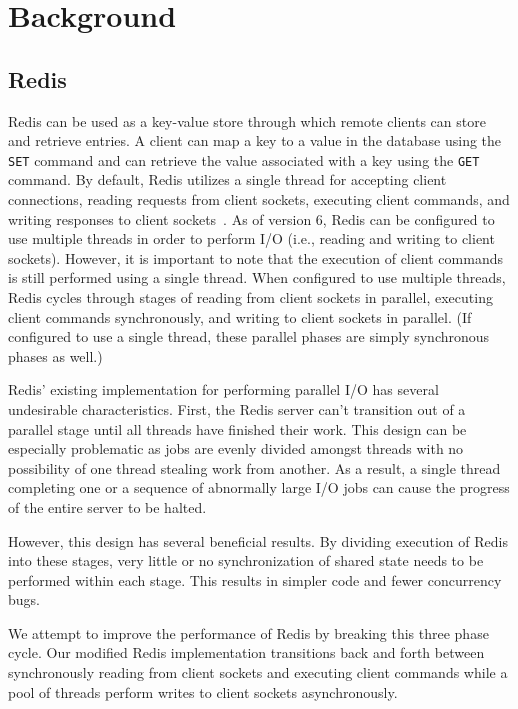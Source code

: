 \documentclass[sigconf, screen]{acmart}
\newcommand{\inlinecode}[1]{\texttt{#1}}
\begin{document}
\section{Background}

\subsection{Redis}
Redis can be used as a key-value store through which remote clients can store and retrieve entries.
A client can map a key to a value in the database using the \inlinecode{SET} command and can retrieve the value associated with a key using the \inlinecode{GET} command.
By default, Redis utilizes a single thread for accepting client connections, reading requests from client sockets, executing client commands, and writing responses to client sockets~\cite{redis-single-threaded}.
As of version 6, Redis can be configured to use multiple threads in order to perform I/O (i.e., reading and writing to client sockets).
However, it is important to note that the execution of client commands is still performed using a single thread.
When configured to use multiple threads, Redis cycles through stages of reading from client sockets in parallel, executing client commands synchronously, and writing to client sockets in parallel.
(If configured to use a single thread, these parallel phases are simply synchronous phases as well.)

Redis' existing implementation for performing parallel I/O has several undesirable characteristics.
First, the Redis server can't transition out of a parallel stage until all threads have finished their work.
This design can be especially problematic as jobs are evenly divided amongst threads with no possibility of one thread stealing work from another.
As a result, a single thread completing one or a sequence of abnormally large I/O jobs can cause the progress of the entire server to be halted.

However, this design has several beneficial results.
By dividing execution of Redis into these stages, very little or no synchronization of shared state needs to be performed within each stage.
This results in simpler code and fewer concurrency bugs.

We attempt to improve the performance of Redis by breaking this three phase cycle.
Our modified Redis implementation transitions back and forth between synchronously reading from client sockets and executing client commands while a pool of threads perform writes to client sockets asynchronously.
\end{document}
